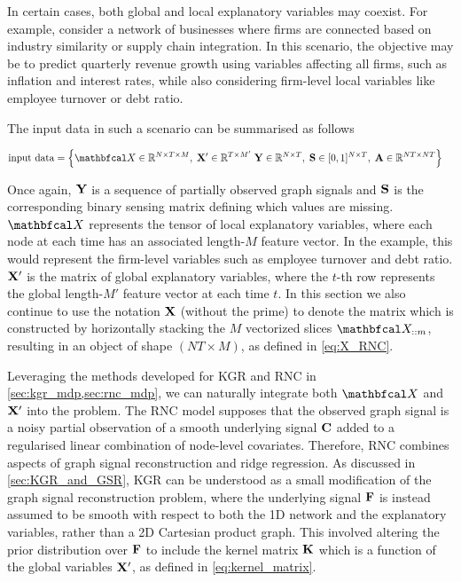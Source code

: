 In certain cases, both global and local explanatory variables may coexist. For example, consider a network of businesses where firms are connected based on industry similarity or supply chain integration. In this scenario, the objective may be to predict quarterly revenue growth using variables affecting all firms, such as inflation and interest rates, while also considering firm-level local variables like employee turnover or debt ratio.

The input data in such a scenario can be summarised as follows

\begin{align*}
    \text{input data} &= \left\{\Xt \in \R^{N \times T \times M}, \; \X' \in \R^{T \times M'} \; \Y \in \R^{N \times T}, \; \Ss \in [0, 1]^{N \times T}, \; \A \in \R^{NT \times NT} \right\}
\end{align*}

Once again, $\mathbf{Y}$ is a sequence of partially observed graph signals and $\mathbf{S}$ is the corresponding binary sensing matrix  defining which values are missing. $\Xt$ represents the tensor of local explanatory variables, where each node at each time has an associated length-$M$ feature vector. In the example, this would represent the firm-level variables such as employee turnover and debt ratio. $\mathbf{X}'$ is the matrix of global explanatory variables, where the $t$-th row represents the global length-$M'$ feature vector at each time $t$. In this section we also continue to use the notation $\mathbf{X}$ (without the prime) to denote the matrix which is constructed by horizontally stacking the $M$ vectorized slices $\Xt_{::m}$, resulting in an object of shape $(NT \times M)$, as defined in \cref{eq:X_RNC}. 

Leveraging the methods developed for KGR and RNC in \cref{sec:kgr_mdp,sec:rnc_mdp}, we can naturally integrate both $\Xt$ and $\mathbf{X}'$ into the problem. The RNC model supposes that the observed graph signal is a noisy partial observation of a smooth underlying signal $\mathbf{C}$ added to a regularised linear combination of node-level covariates. Therefore, RNC combines aspects of graph signal reconstruction and ridge regression. As discussed in \cref{sec:KGR_and_GSR}, KGR can be understood as a small modification of the graph signal reconstruction problem, where the underlying signal $\mathbf{F}$ is instead assumed to be smooth with respect to both the 1D network and the explanatory variables, rather than a 2D Cartesian product graph. This involved altering the prior distribution over $\mathbf{F}$ to include the kernel matrix $\mathbf{K}$ which is a function of the global variables $\mathbf{X}'$, as defined in \cref{eq:kernel_matrix}. 

